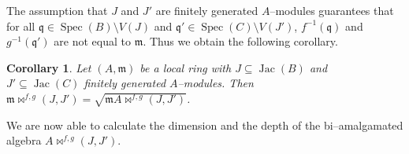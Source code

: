 \documentclass{amsart}%
\theoremstyle{plain}
\newtheorem{corollary}{Corollary}[section]
\numberwithin{equation}{section}
\theoremstyle{definition}
\DeclareMathOperator{\jac}{Jac}
\DeclareMathOperator{\spec}{Spec}
\begin{document}
The assumption that $J$ and $J'$ are finitely generated $A$--modules guarantees that  for all $\mathfrak{q}\in \spec (B)\setminus V(J)$ and $\mathfrak{q}'\in\spec (C)\setminus V(J')$, $f^{-1}(\mathfrak{q})$ and $g^{-1}(\mathfrak{q}')$ are not equal to $\mathfrak{m}$. Thus we obtain the following corollary.

\begin{corollary}
        Let $(A,\mathfrak{m})$ be a local ring with $J\subseteq \jac(B)$ and $J'\subseteq \jac(C)$ finitely generated $A$--modules. Then $\mathfrak{m}\bowtie^{f,g}(J,J')=\sqrt{\mathfrak{m}A\bowtie^{f,g}(J,J')}$.
\end{corollary}

We are now able to calculate the dimension and the depth of the bi--amalgamated algebra $A\bowtie^{f,g}(J,J')$.
\end{document}
